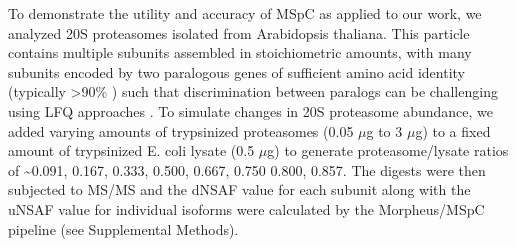 To demonstrate the utility and accuracy of MSpC as applied to our work, we analyzed 20S proteasomes isolated from Arabidopsis thaliana.
This particle contains multiple subunits assembled in stoichiometric amounts, with many subunits encoded by two paralogous genes of sufficient amino acid identity (typically >90\% \citep{yang04}) such that discrimination between paralogs can be challenging using LFQ approaches \citep{book10}.
To simulate changes in 20S proteasome abundance, we added varying amounts of trypsinized proteasomes (0.05 $\mu$g to 3 $\mu$g) to a fixed amount of trypsinized E. coli lysate (0.5 $\mu$g) to generate proteasome/lysate ratios of \textasciitilde0.091, 0.167, 0.333, 0.500, 0.667, 0.750 0.800, 0.857.
The digests were then subjected to MS/MS and the dNSAF value for each subunit along with the uNSAF value for individual isoforms were calculated by the Morpheus/MSpC pipeline (see Supplemental Methods).
